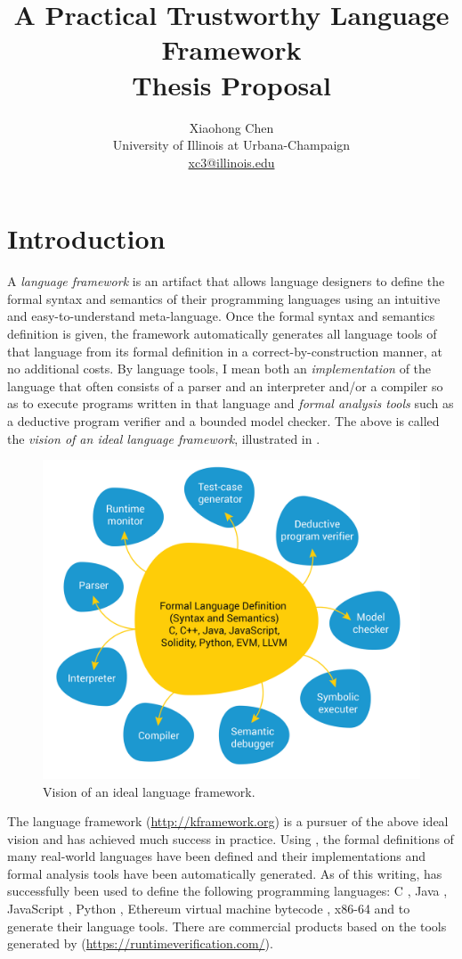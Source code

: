 \documentclass[11pt]{article}
\title{A Practical Trustworthy Language Framework\\ \large Thesis 
Proposal}
\author{Xiaohong Chen \\ University of Illinois at Urbana-Champaign \\ 
\url{xc3@illinois.edu}}
\date{}
\begin{document}
\maketitle

\tableofcontents

\section{Introduction}

A \emph{language framework} is an artifact that allows language designers to 
define the formal syntax and semantics of their programming 
languages using an intuitive and easy-to-understand meta-language. 
Once the formal syntax and semantics definition is given, the framework automatically generates all language tools of that language from 
its formal definition in a correct-by-construction manner, at no additional 
costs. 
By language tools, I mean both an \emph{implementation} of the language
that often consists of a parser and an interpreter and/or a compiler
so as to execute programs written in that language
and \emph{formal analysis tools} such as a deductive program verifier
and a bounded model checker. 
The above is called the \emph{vision of an ideal language framework},
illustrated in . 

\begin{figure}
\centering
\includegraphics[width=0.6\columnwidth]{figs/k-vision.png}
\caption{Vision of an ideal language framework.}
\label{fig:ideal}
\end{figure}

The \K language framework (\url{http://kframework.org}) is a pursuer of the 
above ideal vision and has achieved much success in practice.
Using \K, the formal definitions of many real-world languages
have been defined and their implementations and formal analysis tools have been 
automatically generated. 
As of this writing, \K has successfully been used to define the following 
programming languages:
C \cite{HER15},
Java \cite{BR15},
JavaScript \cite{PSR15},
Python \cite{Gut13},
Ethereum virtual machine bytecode \cite{HSZ+18},
x86-64 \cite{DPK+19}
and to generate their language tools. 
There are commercial products based on the tools generated by \K
(\url{https://runtimeverification.com/}). 
\end{document}
